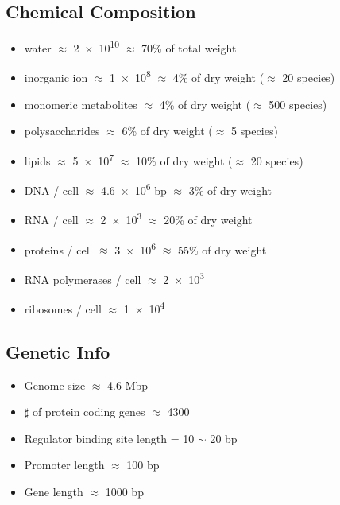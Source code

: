 \documentclass{article}
\begin{document}
        \subsection{Chemical Composition}
        \begin{itemize}
            \item water $\approx$ \num{2e10} $\approx$ 70\% of total weight
            \item inorganic ion $\approx$ \num{1e8} $\approx$ 4\% of dry weight ($\approx$ 20 species) %
            \item monomeric metabolites $\approx$ 4\% of dry weight ($\approx$ 500 species) %
            \item polysaccharides $\approx$ 6\% of dry weight ($\approx$ 5 species) %
            \item lipids $\approx$ \num{5e7} $\approx$ 10\% of dry weight ($\approx$ 20 species) %
            \item DNA / cell $\approx$ \num{4.6e6} bp $\approx$ 3\% of dry weight %
            \item RNA / cell $\approx$ \num{2e3} $\approx$ 20\% of dry weight %
            \item proteins / cell $\approx$ \num{3e6} $\approx$ 55\% of dry weight %
            \item RNA polymerases / cell $\approx$ \num{2e3} %
            \item ribosomes / cell $\approx$ \num{1e4}
        \end{itemize} 

        \subsection{Genetic Info}
        \begin{itemize}
            \item Genome size $\approx$ 4.6 Mbp
            \item $\sharp$ of protein coding genes $\approx$ 4300
            \item Regulator binding site length = 10 $\sim$ 20 bp
            \item Promoter length $\approx$ 100 bp
            \item Gene length $\approx$ 1000 bp
        \end{itemize} 
\end{document}
